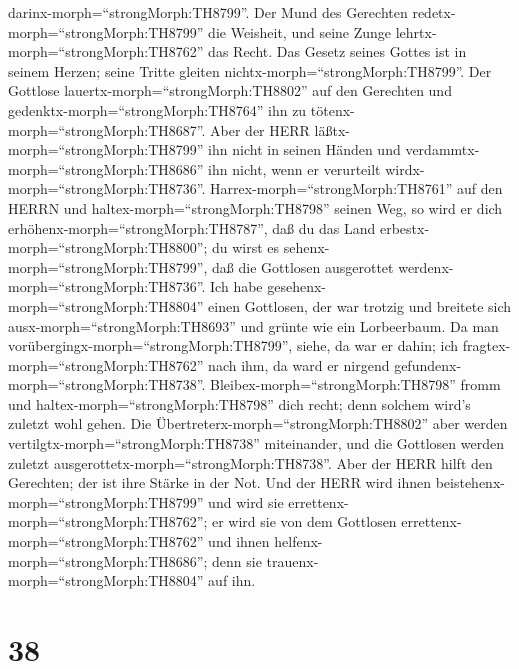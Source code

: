 darinx-morph=``strongMorph:TH8799''.  Der Mund des
Gerechten redetx-morph=``strongMorph:TH8799'' die Weisheit, und seine
Zunge lehrtx-morph=``strongMorph:TH8762'' das Recht.  Das
Gesetz seines Gottes ist in seinem Herzen; seine Tritte gleiten
nichtx-morph=``strongMorph:TH8799''.  Der Gottlose
lauertx-morph=``strongMorph:TH8802'' auf den Gerechten und
gedenktx-morph=``strongMorph:TH8764'' ihn zu
tötenx-morph=``strongMorph:TH8687''.  Aber der HERR
läßtx-morph=``strongMorph:TH8799'' ihn nicht in seinen Händen und
verdammtx-morph=``strongMorph:TH8686'' ihn nicht, wenn er verurteilt
wirdx-morph=``strongMorph:TH8736''. 
Harrex-morph=``strongMorph:TH8761'' auf den HERRN und
haltex-morph=``strongMorph:TH8798'' seinen Weg, so wird er dich
erhöhenx-morph=``strongMorph:TH8787'', daß du das Land
erbestx-morph=``strongMorph:TH8800''; du wirst es
sehenx-morph=``strongMorph:TH8799'', daß die Gottlosen ausgerottet
werdenx-morph=``strongMorph:TH8736''.  Ich habe
gesehenx-morph=``strongMorph:TH8804'' einen Gottlosen, der war trotzig
und breitete sich ausx-morph=``strongMorph:TH8693'' und grünte wie ein
Lorbeerbaum.  Da man
vorübergingx-morph=``strongMorph:TH8799'', siehe, da war er dahin; ich
fragtex-morph=``strongMorph:TH8762'' nach ihm, da ward er nirgend
gefundenx-morph=``strongMorph:TH8738''. 
Bleibex-morph=``strongMorph:TH8798'' fromm und
haltex-morph=``strongMorph:TH8798'' dich recht; denn solchem wird's
zuletzt wohl gehen.  Die
Übertreterx-morph=``strongMorph:TH8802'' aber werden
vertilgtx-morph=``strongMorph:TH8738'' miteinander, und die Gottlosen
werden zuletzt ausgerottetx-morph=``strongMorph:TH8738''. 
Aber der HERR hilft den Gerechten; der ist ihre Stärke in der Not.
 Und der HERR wird ihnen
beistehenx-morph=``strongMorph:TH8799'' und wird sie
errettenx-morph=``strongMorph:TH8762''; er wird sie von dem Gottlosen
errettenx-morph=``strongMorph:TH8762'' und ihnen
helfenx-morph=``strongMorph:TH8686''; denn sie
trauenx-morph=``strongMorph:TH8804'' auf ihn.

\hypertarget{section-37}{%
\section{38}\label{section-37}}

